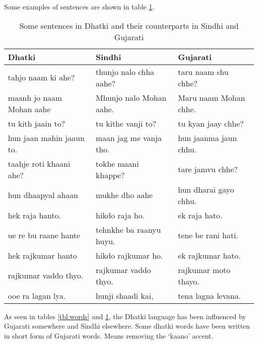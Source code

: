 Some examples of sentences are shown in table \ref{tbl:sent}.
\begin{table}
\begin{center}
\begin{tabular}{l|l|l}
\hline
\textbf{Dhatki} & \textbf{Sindhi} & \textbf{Gujarati} \\
\hline
tahjo naam ki ahe? & thunjo nalo chha aahe? & taru naam shu chhe? \\ 
maanh jo naam Mohan aahe & Mhunjo nalo Mohan aahe. & Maru naam Mohan chhe. \\ 
tu kith jaain to? & tu kithe vanji to? & tu kyan jaay chhe? \\ 
hun jaan mahin jaaun to. & maan jag me vanja tho. & hun jaanma jaun chhu. \\ 
taahje roti khaani ahe? & tokhe maani khappe? & tare jamvu chhe? \\ 
hun dhaapyal ahaan & mukhe dho aahe & hun dharai gayo chhu. \\ 
hek raja hanto. & hikdo raja ho. & ek raja hato. \\ 
ue re bu raane hante & tehnkhe ba raanyu huyu. & tene be rani hati. \\ 
hek rajkumar hanto & hikdo rajkumar ho. & ek rajkumar hato. \\ 
rajkumar vaddo thyo. & rajkumar vaddo thyo. & rajkumar moto thayo. \\ 
ooe ra lagan lya. & hunji shaadi kai, & tena lagna levana.\\
\hline
\end{tabular}
\end{center}
\caption{Some sentences in Dhatki and their counterparts in Sindhi and Gujarati}
\label{tbl:sent}
\end{table}
As seen in tables \ref{tbl:words} and \ref{tbl:sent}, the Dhatki language has been influenced by Gujarati somewhere and Sindhi elsewhere. Some dhatki words have been written in short form of Gujarati words. Means removing the `kaano' accent.

